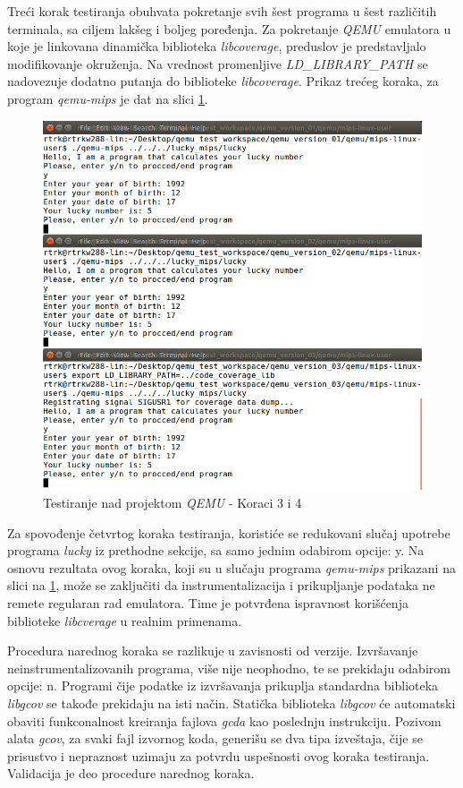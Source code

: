 \documentclass[12pt,oneside]{memoir}
\newcommand{\strano}[1]{\textit{#1}}
\begin{document}
Treći korak testiranja obuhvata pokretanje svih šest programa u šest različitih terminala, sa ciljem lakšeg i boljeg poređenja.  Za pokretanje \strano{QEMU} emulatora u koje je linkovana dinamička biblioteka \strano{libcoverage}, preduslov je predstavljalo modifikovanje okruženja. Na vrednost promenljive \strano{LD\_LIBRARY\_PATH} se nadovezuje dodatno putanja do biblioteke \strano{libcoverage}. Prikaz trećeg koraka, za program \strano{qemu-mips} je dat na slici \ref{fig:qemu-test-34}.


\begin{figure}[!ht]
  \centering
  \includegraphics[width=\textwidth]{img/qemu-test-23-ng.png}
  \caption{Testiranje nad projektom \strano{QEMU} - Koraci 3 i 4}
  \label{fig:qemu-test-34}
\end{figure} 

Za spovođenje četvrtog koraka testiranja, koristiće se redukovani slučaj upotrebe programa \strano{lucky} iz prethodne sekcije, sa samo jednim odabirom opcije: y. Na osnovu rezultata ovog koraka, koji su u slučaju programa \strano{qemu-mips} prikazani na slici na \ref{fig:qemu-test-34}, može se zaključiti da instrumentalizacija i prikupljanje podataka ne remete regularan rad emulatora. Time je potvrđena ispravnost korišćenja biblioteke \strano{libcverage} u realnim primenama. 

Procedura narednog koraka se razlikuje u zavisnosti od verzije. Izvršavanje neinstrumentalizovanih programa, više nije neophodno, te se prekidaju odabirom opcije: n. Programi čije podatke iz izvršavanja prikuplja standardna biblioteka \strano{libgcov} se takođe prekidaju na isti način. Statička biblioteka \strano{libgcov} će automatski obaviti funkconalnost kreiranja fajlova \strano{gcda} kao poslednju instrukciju. Pozivom alata \strano{gcov}, za svaki fajl izvornog koda, generišu se dva tipa izveštaja, čije se prisustvo i nepraznost uzimaju za potvrdu uspešnosti ovog koraka testiranja. Validacija je deo procedure narednog koraka. 
\end{document}
